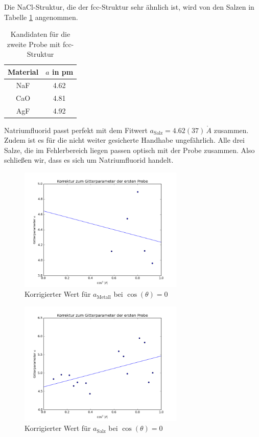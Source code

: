 \noindent
Die NaCl-Struktur, die der fcc-Struktur sehr ähnlich ist, wird von den Salzen in Tabelle \ref{tab:matProb2} angenommen.

\begin{table}[H]
 \begin{tabular}{cc}
Material &$a$ in pm\\
\hline
NaF& 4.62\\
CaO & 4.81\\
AgF & 4.92\\
  
 \end{tabular}
 \caption{Kandidaten für die zweite Probe mit fcc-Struktur \cite{Gitterparameter}}
 \label{tab:matProb2}

\end{table}
\noindent Natriumfluorid passt perfekt mit dem Fitwert  $a_\text{Salz} = 4.62(37)\, \mathring{A} $ zusammen. Zudem ist es für die nicht weiter gesicherte
Handhabe ungefährlich. Alle drei Salze, die im Fehlerbereich liegen passen optisch mit der Probe zusammen. Also schließen wir, dass es sich um Natriumfluorid
handelt.

\begin{figure}[h]
 \includegraphics[width=0.7\textwidth]{../auswertung/metall.png}
 \caption{Korrigierter Wert für $a_\text{Metall}$ bei $\cos(\theta)=0$}
 \label{pic:fita1}
\end{figure}

\begin{figure}[hb]
 \includegraphics[width=0.7\textwidth]{../auswertung/salz.png}
 \caption{Korrigierter Wert für $a_\text{Salz}$ bei $\cos(\theta)=0$}
 \label{pic:fita2}
\end{figure}


